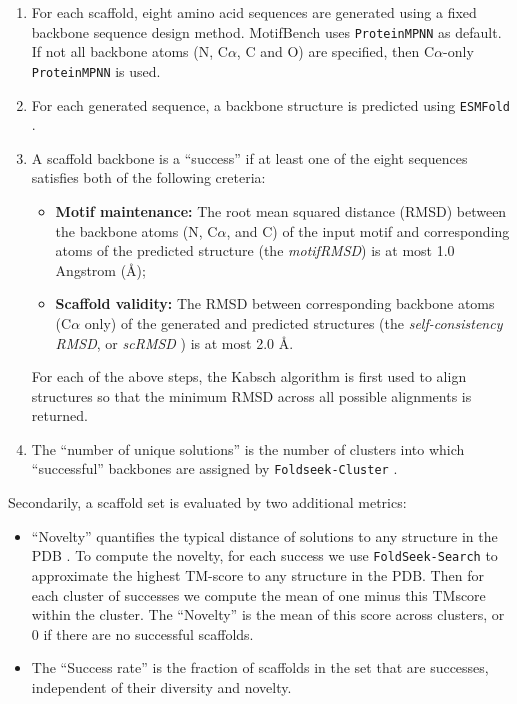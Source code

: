 \begin{enumerate}
    \item{For each scaffold, eight amino acid sequences are generated using a fixed backbone sequence design method. MotifBench uses \texttt{ProteinMPNN} \citep{dauparas2022robust} as default. 
    If not all backbone atoms (N, C$\alpha$, C and O) are specified, then C$\alpha$-only \texttt{ProteinMPNN} is used.
    }
    \item{For each generated sequence, a backbone structure is predicted using \texttt{ESMFold} \citep{lin2022language}.}
    \item{A scaffold backbone is a ``success'' if at least one of the eight sequences satisfies both of the following creteria:
    \begin{itemize}
        \item {\textbf{Motif maintenance:} The root mean squared distance (RMSD) between the backbone atoms (N, C$\alpha$, and C) of the input motif and corresponding atoms of the predicted structure (the \emph{motifRMSD}) is at most 1.0 Angstrom (\AA);}
        \item{\textbf{Scaffold validity:} The RMSD between corresponding backbone atoms (C$\alpha$ only) of the generated and predicted structures (the \emph{self-consistency RMSD}, or \emph{scRMSD} \citep{trippe2022diffusion}) is at most 2.0 \AA.}
    \end{itemize}
    For each of the above steps, the Kabsch algorithm \citep{kabsch1976solution} is first used to align structures so that the minimum RMSD across all possible alignments is returned.
    }
    \item{The ``number of unique solutions'' is the number of clusters into which ``successful'' backbones are assigned by \texttt{Foldseek-Cluster} \citep{barrio2023clustering}.}
\end{enumerate}

Secondarily, a scaffold set is evaluated by two additional metrics:
\begin{itemize}
\item{``Novelty'' quantifies the typical distance of solutions to any structure in the PDB \citep{berman2002protein}. 
 To compute the novelty, for each success we use \texttt{FoldSeek-Search} \citep{van2024fast} to approximate the highest TM-score \citep{zhang2005tm} to any structure in the PDB.
 Then for each cluster of successes we compute the mean of one minus this TMscore within the cluster.
 The  ``Novelty'' is the mean of this score across clusters, or $0$ if there are no successful scaffolds.}
\item{The ``Success rate'' is the fraction of scaffolds in the set that are successes, independent of their diversity and novelty.}
\end{itemize}

